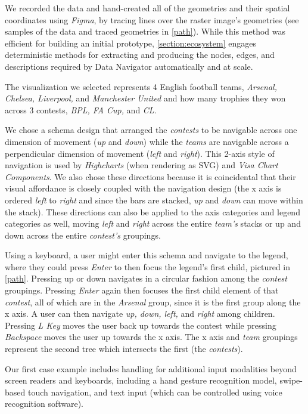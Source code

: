 \documentclass[journal]{vgtc}                %
\begin{document}
We recorded the data and hand-created all of the geometries and their spatial coordinates using \textit{Figma}, by tracing lines over the raster image's geometries (see samples of the data and traced geometries in \autoref{path}). While this method was efficient for building an initial prototype, \autoref{section:ecosystem} engages deterministic methods for extracting and producing the nodes, edges, and descriptions required by Data Navigator automatically and at scale.

The visualization we selected represents 4 English football teams, \textit{Arsenal, Chelsea, Liverpool,} and \textit{Manchester United} and how many trophies they won across 3 contests, \textit{BPL, FA Cup,} and \textit{CL}.

We chose a schema design that arranged the \textit{contests} to be navigable across one dimension of movement (\textit{up} and \textit{down}) while the \textit{teams} are navigable across a perpendicular dimension of movement (\textit{left} and \textit{right}). This 2-axis style of navigation is used by \textit{Highcharts} (when rendering as SVG) and \textit{Visa Chart Components}. We also chose these directions because it is coincidental that their visual affordance is closely coupled with the navigation design (the x axis is ordered \textit{left} to \textit{right} and since the bars are stacked, \textit{up} and \textit{down} can move within the stack). These directions can also be applied to the axis categories and legend categories as well, moving \textit{left} and \textit{right} across the entire \textit{team's} stacks or up and down across the entire \textit{contest's} groupings.

Using a keyboard, a user might enter this schema and navigate to the legend, where they could press \textit{Enter} to then focus the legend's first child, pictured in \autoref{path}. Pressing up or down navigates in a circular fashion among the \textit{contest} groupings. Pressing \textit{Enter} again then focuses the first child element of that \textit{contest}, all of which are in the \textit{Arsenal} group, since it is the first group along the x axis. A user can then navigate \textit{up, down, left,} and \textit{right} among children. Pressing \textit{L Key} moves the user back up towards the contest while pressing \textit{Backspace} moves the user up towards the x axis. The x axis and \textit{team} groupings represent the second tree which intersects the first (the \textit{contests}).

Our first case example includes handling for additional input modalities beyond screen readers and keyboards, including a hand gesture recognition model, swipe-based touch navigation, and text input (which can be controlled using voice recognition software).
\end{document}
